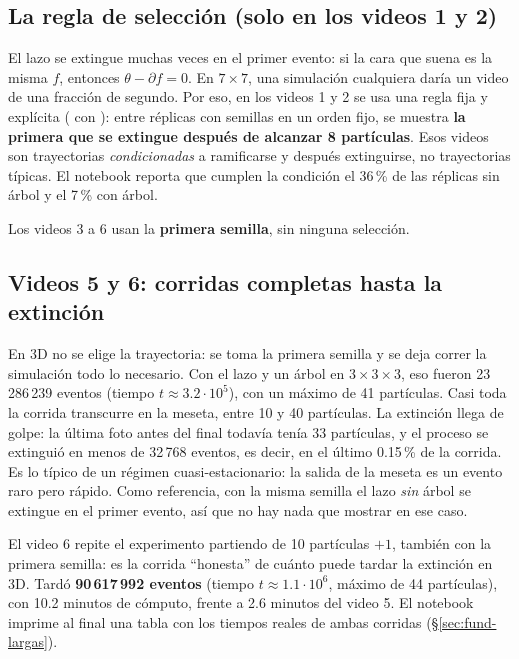 \documentclass[11pt,a4paper]{article}
\theoremstyle{plain}
\theoremstyle{remark}
\newcommand{\fn}[1]{\texttt{\detokenize{#1}}}
\begin{document}
\subsection{La regla de selección (solo en los videos 1 y 2)}

El lazo se extingue muchas veces en el primer evento: si la cara que suena es la misma $f$, entonces $\theta-\partial f=0$. En $7\times7$, una simulación cualquiera daría un video de una fracción de segundo. Por eso, en los videos 1 y 2 se usa una regla fija y explícita (\fn{first_replica_where} con \fn{branched_then_extinct}): entre réplicas con semillas en un orden fijo, se muestra \textbf{la primera que se extingue después de alcanzar 8 partículas}. Esos videos son trayectorias \emph{condicionadas} a ramificarse y después extinguirse, no trayectorias típicas. El notebook reporta que cumplen la condición el 36\,\% de las réplicas sin árbol y el 7\,\% con árbol.

Los videos 3 a 6 usan la \textbf{primera semilla}, sin ninguna selección.

\subsection{Videos 5 y 6: corridas completas hasta la extinción}

En 3D no se elige la trayectoria: se toma la primera semilla y se deja correr la simulación todo lo necesario. Con el lazo y un árbol en $3\times3\times3$, eso fueron 23\,286\,239 eventos (tiempo $t\approx3.2\cdot10^{5}$), con un máximo de 41 partículas. Casi toda la corrida transcurre en la meseta, entre 10 y 40 partículas. La extinción llega de golpe: la última foto antes del final todavía tenía 33 partículas, y el proceso se extinguió en menos de 32\,768 eventos, es decir, en el último 0.15\,\% de la corrida. Es lo típico de un régimen cuasi-estacionario: la salida de la meseta es un evento raro pero rápido. Como referencia, con la misma semilla el lazo \emph{sin} árbol se extingue en el primer evento, así que no hay nada que mostrar en ese caso.

El video 6 repite el experimento partiendo de 10 partículas $+1$, también con la primera semilla: es la corrida ``honesta'' de cuánto puede tardar la extinción en 3D. Tardó \textbf{90\,617\,992 eventos} (tiempo $t\approx1.1\cdot10^{6}$, máximo de 44 partículas), con 10.2 minutos de cómputo, frente a 2.6 minutos del video 5. El notebook imprime al final una tabla con los tiempos reales de ambas corridas (\S\ref{sec:fund-largas}).
\end{document}
